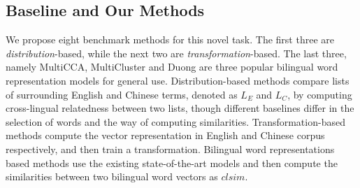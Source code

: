 \subsection{Baseline and Our Methods} 
We propose eight benchmark methods for this novel task. 
The first three are \emph{distribution}-based, while the next two 
are \emph{transformation}-based. 
The last three, namely MultiCCA,
MultiCluster and Duong are three popular bilingual word representation models for general use.   
Distribution-based methods compare lists of surrounding
English and Chinese terms, denoted as $L_E$ and $L_C$, 
by computing cross-lingual relatedness between two lists, 
though different baselines differ in the
selection of words and the way of computing similarities.
Transformation-based methods compute the vector representation 
in English and Chinese corpus respectively, and
then train a transformation.
Bilingual word representations based methods use the existing state-of-the-art models and then compute the similarities between two bilingual word vectors as $clsim$.
